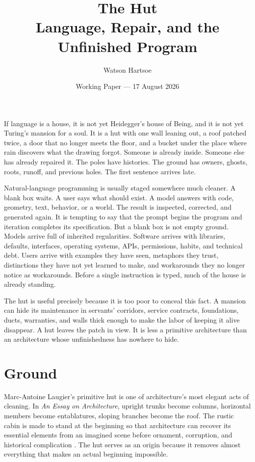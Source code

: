 \documentclass[11pt]{article}
\title{The Hut\\\large Language, Repair, and the Unfinished Program}
\author{Watson Hartsoe}
\date{Working Paper --- 17 August 2026}
\begin{document}
\maketitle

If language is a house, it is not yet Heidegger's house of Being, and it is not yet Turing's mansion for a soul. It is a hut with one wall leaning out, a roof patched twice, a door that no longer meets the floor, and a bucket under the place where rain discovers what the drawing forgot. Someone is already inside. Someone else has already repaired it. The poles have histories. The ground has owners, ghosts, roots, runoff, and previous holes. The first sentence arrives late.

Natural-language programming is usually staged somewhere much cleaner. A blank box waits. A user says what should exist. A model answers with code, geometry, text, behavior, or a world. The result is inspected, corrected, and generated again. It is tempting to say that the prompt begins the program and iteration completes its specification. But a blank box is not empty ground. Models arrive full of inherited regularities. Software arrives with libraries, defaults, interfaces, operating systems, APIs, permissions, habits, and technical debt. Users arrive with examples they have seen, metaphors they trust, distinctions they have not yet learned to make, and workarounds they no longer notice as workarounds. Before a single instruction is typed, much of the house is already standing.

The hut is useful precisely because it is too poor to conceal this fact. A mansion can hide its maintenance in servants' corridors, service contracts, foundations, ducts, warranties, and walls thick enough to make the labor of keeping it alive disappear. A hut leaves the patch in view. It is less a primitive architecture than an architecture whose unfinishedness has nowhere to hide.

\section*{Ground}

Marc-Antoine Laugier's primitive hut is one of architecture's most elegant acts of cleaning. In \emph{An Essay on Architecture}, upright trunks become columns, horizontal members become entablatures, sloping branches become the roof. The rustic cabin is made to stand at the beginning so that architecture can recover its essential elements from an imagined scene before ornament, corruption, and historical complication \cite{laugier1755}. The hut serves as an origin because it removes almost everything that makes an actual beginning impossible.
\end{document}
